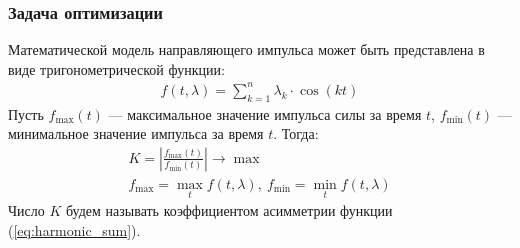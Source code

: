 \documentclass[10pt, pdf, hyperref={unicode}]{beamer}
\begin{document}
    \begin{frame}
        \frametitle{Задача оптимизации}
        \begin{center}
            \begin{minipage}[h]{0.97\linewidth}
                Математической модель направляющего импульса может быть представлена в виде тригонометрической функции:
                \begin{equation}\label{eq:harmonic_sum}
                    \begin{gathered}
                        f(t, \lambda) = \sum\limits_{k = 1}^n \lambda_k \cdot \cos(kt)
                    \end{gathered}
                \end{equation}
                Пусть $f_{\max}(t)$ --- максимальное значение импульса силы за время $t$, $f_{\min}(t)$ --- минимальное значение импульса за время $t$. Тогда:
                \begin{equation}\label{eq:optim}
                    \begin{gathered}
                        K = \left| \frac{f_{\max}(t)}{f_{\min}(t)} \right| \rightarrow \max \\
                        f_{\max} = \max_t f(t, \lambda), \ f_{\min} = \min_t f(t, \lambda)
                    \end{gathered}
                \end{equation}
                Число $K$ будем называть коэффициентом асимметрии функции (\ref{eq:harmonic_sum}).
            \end{minipage}
        \end{center}
    \end{frame}
\end{document}
